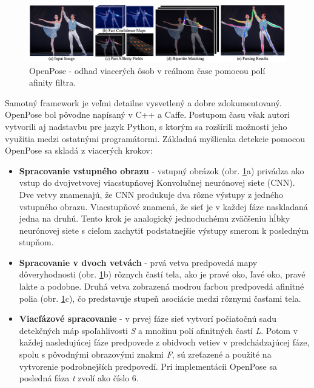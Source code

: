\documentclass[slovak,master,dept460,male,cpp,cpdeclaration]{diploma}
\begin{document}
\begin{figure}[H]
	\centering
	\includegraphics[width=1\textwidth]{Figures/openposePipeline.png}
	\caption{OpenPose - odhad viacerých ôsob v reálnom čase pomocou polí afinity filtra.\cite{cao2018openpose}}
	\label{fig:openposeOverall}
\end{figure}

 Samotný framework je veľmi detailne vysvetlený a dobre zdokumentovaný. OpenPose bol pôvodne napísaný v C++ a Caffe\cite{jia2014caffe}. Postupom času však  autori vytvorili aj  nadstavbu pre jazyk Python, s ktorým sa rozšírili možnosti jeho využitia medzi ostatnými programátormi. Základná myšlienka detekcie pomocou OpenPose sa skladá z viacerých krokov:

\begin{itemize}
\item \textbf{Spracovanie vstupného obrazu} - vstupný obrázok (obr. \ref{fig:openposeOverall}a) privádza ako vstup do dvojvetvovej viacstupňovej Konvolučnej neurónovej siete (CNN). Dve vetvy znamenajú, že CNN produkuje dva rôzne výstupy z jedného vstupného obrazu. Viacstupňové znamená, že sieť je v každej fáze naskladaná jedna na druhú. Tento krok je analogický jednoduchému zväčšeniu hĺbky neurónovej siete s cieľom zachytiť podstatnejšie výstupy smerom k posledným stupňom.

\item \textbf{Spracovanie v dvoch vetvách} - prvá vetva predpovedá mapy dôveryhodnosti (obr. \ref{fig:openposeOverall}b) rôznych častí tela, ako je pravé oko, ľavé oko, pravé lakte a podobne. Druhá vetva zobrazená modrou farbou predpovedá afinitné polia (obr. \ref{fig:openposeOverall}c), čo predstavuje stupeň asociácie medzi rôznymi časťami tela.

\item \textbf{Viacfázové spracovanie} - v prvej fáze sieť vytvorí počiatočnú sadu detekčných máp spoľahlivosti \textit{S} a množinu polí afinitných častí \textit{L}. Potom v každej nasledujúcej fáze predpovede z obidvoch vetiev v predchádzajúcej fáze, spolu s pôvodnými obrazovými znakmi \textit{F}, sú zreťazené a použité na vytvorenie podrobnejších predpovedí. Pri implementácii OpenPose sa posledná fáza \textit{t} zvolí ako číslo 6.
\end{itemize}
\end{document}

